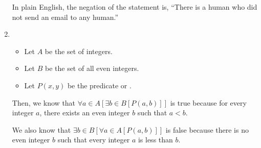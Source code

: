 \documentclass{article}
\begin{document}
\begin{enumerate}
            In plain English, the negation of the statement is, ``There is a human who did not send an email to any human.''

            \newpage

      \item 
      \begin{itemize}
      \item Let $A$ be the set of integers.
      \item Let $B$ be the set of all even integers.
      \item Let $P(x,y)$ be the predicate  or  .
      \end{itemize}
            Then, we know that $\forall a \in A [ \exists b \in B [ P(a,b) ] ]$ is true because for every integer $a$, there exists an even integer $b$ such that $a < b$.

            We also know that $\exists b \in B [ \forall a \in A [ P(a,b) ] ]$ is false because there is no even integer $b$ such that every integer $a$ is less than $b$.

\end{enumerate}
\end{document}

